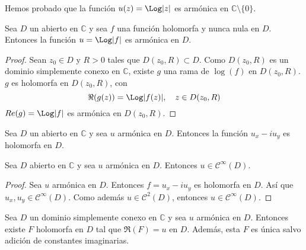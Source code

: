 Hemos probado que la función $u(z) = \Log|z|$ es armónica en $\mathbb{C} \setminus \{0\}$.

\begin{lemma}
    Sea $D$ un abierto en $\mathbb{C}$ y sea $f$ una función holomorfa y nunca nula en $D$.
    Entonces la función $u = \Log|f|$ es armónica en $D$.
\end{lemma}

\begin{proof}
    Sean $z_0 \in D$ y $R > 0$ tales que $D(z_0, R) \subset D$.
    Como $D(z_0, R)$ es un dominio simplemente conexo en $\mathbb{C}$, existe $g$ una rama de $\log(f)$ en $D(z_0, R)$.
    $g$ es holomorfa en $D(z_0, R)$, con
    $$\Re(g(z)) = \Log|f(z)|, \quad z \in D(z_0, R)$$
    $Re(g) = \Log|f|$ es armónica en $D(z_0, R)$.
\end{proof}

\begin{proposition}
    Sea $D$ un abierto en $\mathbb{C}$ y sea $u$ armónica en $D$.
    Entonces la función $u_x - iu_y$ es holomorfa en $D$.
\end{proposition}


\begin{corollary}
    Sea $D$ abierto en $\mathbb{C}$ y sea $u$ armónica en $D$.
    Entonces $u \in \mathcal{C}^\infty(D)$.
\end{corollary}

\begin{proof}
    Sea $u$ armónica en $D$.
    Entonces $f = u_x - iu_y$ es holomorfa en $D$.
    Así que $u_x, u_y \in \mathcal{C}^\infty(D)$.
    Como además $u \in \mathcal{C}^2(D)$, entonces $u \in \mathcal{C}^\infty(D)$.
\end{proof}

\begin{proposition}
    Sea $D$ un dominio simplemente conexo en $\mathbb{C}$ y sea $u$ armónica en $D$.
    Entonces existe $F$ holomorfa en $D$ tal que $\Re(F) = u$ en $D$.
    Además, esta $F$ es única salvo adición de constantes imaginarias.
\end{proposition}

